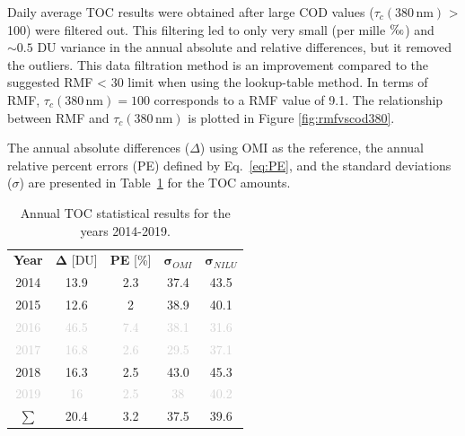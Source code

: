 \documentclass{optica-article}
\begin{document}
Daily average TOC results were obtained after large COD values ($\tau_c{\scriptstyle(380 \, \text{nm})}$ > 100)  were filtered out.
This filtering led to only very small (per mille $\text{\textperthousand}$) and $\sim 0.5$ DU variance in the annual absolute and relative  differences, but it removed the outliers.
This data filtration method is an improvement compared to the suggested \cite{Hoiskar2003}  RMF < 30 limit when using the lookup-table method.
In terms of RMF,  $\tau_c{\scriptstyle(380 \, \text{nm})} = 100$ corresponds to a RMF value of 9.1.
The relationship between RMF and $\tau_c{\scriptstyle(380 \, \text{nm})}$ is plotted in Figure \ref{fig:rmfvscod380}.


The annual absolute differences ($\Delta$) using OMI as the reference, the annual relative percent errors (PE) defined by Eq.~\ref{eq:PE}, and the standard deviations ($\sigma$)  are presented in Table~\ref{tab:nnstatistics} for the TOC amounts.
\begin{table}[H]
	\centering
	\begin{tabular}{| c | c | c | c | c |}
		\hline
		\textbf{Year} & $\bm{\Delta}$ [DU] & \textbf{PE} [\%]& $\bm{\sigma}_{OMI}$ & $\bm{\sigma}_{NILU}$ \\
		\Xhline{2\arrayrulewidth}
		2014      & 13.9                    & 2.3                      & 37.4                 & 43.5                     \\
		\hline
		2015      & 12.6                       & 2                       & 38.9                  & 40.1                  \\
		\hline
		\textcolor{lightgray}{2016}      & \textcolor{lightgray}{46.5}                 &  \textcolor{lightgray}{7.4}                       & \textcolor{lightgray}{38.1}                  & \textcolor{lightgray}{31.6}                  \\
		\hline
		\textcolor{lightgray}{2017}      & \textcolor{lightgray}{16.8} & \textcolor{lightgray}{2.6}        & \textcolor{lightgray}{29.5}     & \textcolor{lightgray}{37.1}   \\
		\hline
		2018      & 16.3                      & 2.5                       & 43.0                   & 45.3                \\
		\hline
		\textcolor{lightgray}{2019}      &  \textcolor{lightgray}{16}       &  \textcolor{lightgray}{2.5}       & \textcolor{lightgray}{38}				 &  \textcolor{lightgray}{40.2}					\\
		\Xhline{2\arrayrulewidth}
		$\bm{\sum}$ & 20.4 & 3.2 & 37.5 & 39.6 \\
		\hline
	\end{tabular}
	\caption{Annual TOC statistical results for the years 2014-2019.}
	\label{tab:nnstatistics}
\end{table}
\end{document}
